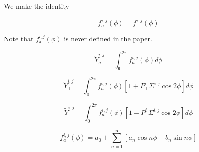 \documentclass{article}
\begin{document}
We make the identity

\begin{equation}
  f^{i,j}_a(\phi) = f^{i,j}(\phi)
\end{equation}

Note that $f^{i,j}_a(\phi)$ is never defined in the paper.

\begin{equation}
  \tilde Y^{i,j}_a = \int^{2\pi}_0 f^{i,j}_a(\phi)d\phi
  \tag{A7}
\end{equation}

\begin{equation}
  \tilde Y^{i,j}_\perp = \int^{2\pi}_0 f^{i,j}_a(\phi)[1+P^i_\perp\Sigma^{i,j}\cos2\phi]d\phi
  \tag{A8}
\end{equation}

\begin{equation}
  \tilde Y^{i,j}_\parallel = \int^{2\pi}_0 f^{i,j}_a(\phi)[1-P^i_\parallel\Sigma^{i,j}\cos2\phi]d\phi
  \tag{A9}
\end{equation}

\begin{equation}
  f^{i,j}_a(\phi) = a_0 + \sum_{n=1}^\infty [a_n \cos n\phi + b_n\sin n\phi]
  \tag{A10}
\end{equation}
\end{document}
